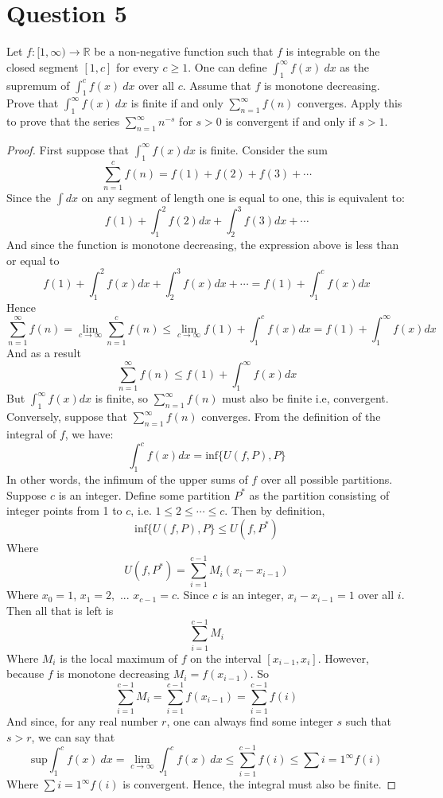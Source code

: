 \documentclass[12pt, letterpaper]{article}
\begin{document}
\section*{Question 5}
Let $f: [1,\infty)\rightarrow \mathbb R$ be a non-negative function such that $f$ is integrable on the closed segment $[1,c]$ for every $c\geq 1$. One can define
$\int_{1}^{\infty} f(x) ~dx$ as the supremum of $\int_{1}^{c} f(x) ~dx$ over all $c$.
Assume that $f$ is monotone decreasing. Prove that $\int_{1}^{\infty} f(x) ~dx$ is finite
if and only $\sum_{n=1}^{\infty} f(n)$ converges.  Apply this to prove that the series $\sum_{n=1}^{\infty} n^{-s}$ for $s>0$ is convergent if and only if $s>1$.
\begin{proof}
  First suppose that $\int_{1}^{\infty}f(x)dx$ is finite. Consider the sum
  $$ \sum_{n=1}^{c}f(n) = f(1) + f(2) + f(3) + \cdots $$
  Since the $\int dx$ on any segment of length one is equal to one, this is equivalent to:
  $$ f(1) + \int_{1}^{2}f(2)dx + \int_{2}^{3}f(3)dx + \cdots $$
  And since the function is monotone decreasing, the expression above is less than or equal to
  $$ f(1) + \int_{1}^{2}f(x)dx + \int_{2}^{3}f(x)dx + \cdots = f(1) + \int_{1}^{c}f(x)dx$$
  Hence
  $$ \sum_{n=1}^{\infty}f(n)= \lim_{c\to\infty}\sum_{n=1}^{c}f(n) \leq \lim_{c\to\infty} f(1) + \int_{1}^{c}f(x)dx = f(1) + \int_{1}^{\infty}f(x)dx$$
  And as a result
  $$ \sum_{n=1}^{\infty}f(n) \leq f(1) + \int_{1}^{\infty}f(x)dx $$
  But $\int_{1}^{\infty}f(x)dx$ is finite, so $\sum_{n=1}^{\infty}f(n)$ must also be finite i.e, convergent.\\

  \noindent Conversely, suppose that $\sum_{n=1}^{\infty}f(n)$ converges.
  From the definition of the integral of $f$, we have:
  $$ \int_{1}^{c}f(x)dx = \text{inf}\{U(f, P), P\} $$
  In other words, the infimum of the upper sums of $f$ over all possible partitions. Suppose $c$ is an integer. Define some partition $P^*$ as the partition consisting of integer points from 1 to $c$, i.e. $1 \leq 2 \leq \cdots \leq c$. Then by definition,
  $$ \text{inf}\{U(f, P), P\} \leq U(f, P^*) $$
  Where
  $$U(f, P^*) = \sum_{i=1}^{c-1}M_i(x_i - x_{i-1})$$
  Where $x_0 = 1$, $x_1 = 2,$ ... $x_{c-1} = c$. Since $c$ is an integer, $x_i - x_{i-1} = 1$ over all $i$. Then all that is left is
  $$  \sum_{i=1}^{c-1}M_i $$
  Where $M_i$ is the local maximum of $f$ on the interval $[x_{i-1}, x_i]$. However, because $f$ is monotone decreasing $M_i = f(x_{i-1})$. So
  $$ \sum_{i=1}^{c-1}M_i = \sum_{i=1}^{c-1}f(x_{i-1}) = \sum_{i=1}^{c-1}f(i) $$
  And since, for any real number $r$, one can always find some integer $s$ such that $s > r$, we can say that
  $$\text{sup}\int_{1}^{c} f(x) ~dx = \lim_{c\to\infty}\int_{1}^{c} f(x) ~dx \leq \sum_{i=1}^{c-1}f(i) \leq \sum{i=1}^{\infty}f(i)$$
  Where $\sum{i=1}^{\infty}f(i)$ is convergent. Hence, the integral must also be finite.
\end{proof}
\end{document}
